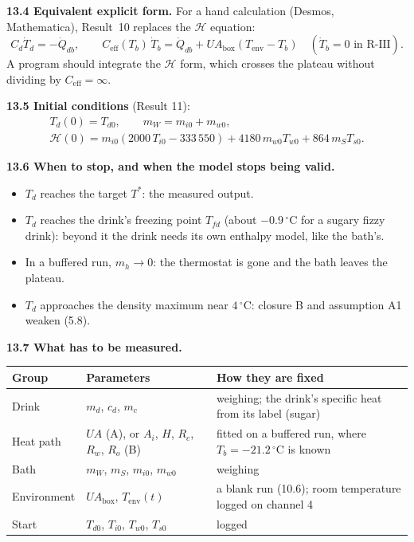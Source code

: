 \documentclass[11pt,a4paper]{article}
\newcommand{\Hb}{\mathcal{H}}
\newcommand{\Qdb}{\dot Q_{db}}
\newcommand{\Ceff}{C_{\mathrm{eff}}}
\newcommand{\UAbox}{UA_{\mathrm{box}}}
\newcommand{\Tenv}{T_{\mathrm{env}}}
\newcommand{\dC}{\,{}^{\circ}\mathrm{C}}
\newcommand{\sub}[1]{\par\smallskip\noindent\textbf{#1}\enspace}
\begin{document}
\sub{13.4 Equivalent explicit form.} For a hand calculation (Desmos, Mathematica), Result~10 replaces the
$\Hb$ equation:
\[
C_d\dot T_d = -\Qdb, \qquad \Ceff(T_b)\,\dot T_b = \Qdb + \UAbox(\Tenv - T_b)\quad(\dot T_b = 0 \text{ in R-III}).
\]
A program should integrate the $\Hb$ form, which crosses the plateau without dividing by $\Ceff=\infty$.

\sub{13.5 Initial conditions} (Result 11):
\begin{gather*}
T_d(0) = T_{d0},\qquad m_W = m_{i0}+m_{w0},\\
\Hb(0) = m_{i0}(2000\,T_{i0}-333\,550) + 4180\,m_{w0}T_{w0} + 864\,m_ST_{s0}.
\end{gather*}

\sub{13.6 When to stop, and when the model stops being valid.}
\begin{itemize}
  \item $T_d$ reaches the target $T^*$: the measured output.
  \item $T_d$ reaches the drink's freezing point $T_{fd}$ (about $-0.9\dC$ for a sugary fizzy drink):
        beyond it the drink needs its own enthalpy model, like the bath's.
  \item In a buffered run, $m_h\to0$: the thermostat is gone and the bath leaves the plateau.
  \item $T_d$ approaches the density maximum near $4\dC$: closure B and assumption A1 weaken (5.8).
\end{itemize}

\sub{13.7 What has to be measured.}

{\small
\begin{tabularx}{\linewidth}{l >{\raggedright\arraybackslash}X >{\raggedright\arraybackslash}X}
\toprule
Group & Parameters & How they are fixed \\
\midrule
Drink & $m_d$, $c_d$, $m_c$ & weighing; the drink's specific heat from its label (sugar) \\
Heat path & $UA$ (A), or $A_i$, $H$, $R_c$, $R_w$, $R_o$ (B) & fitted on a buffered run, where $T_b = -21.2\dC$ is known \\
Bath & $m_W$, $m_S$, $m_{i0}$, $m_{w0}$ & weighing \\
Environment & $\UAbox$, $\Tenv(t)$ & a blank run (10.6); room temperature logged on channel 4 \\
Start & $T_{d0}$, $T_{i0}$, $T_{w0}$, $T_{s0}$ & logged \\
\bottomrule
\end{tabularx}}
\end{document}
